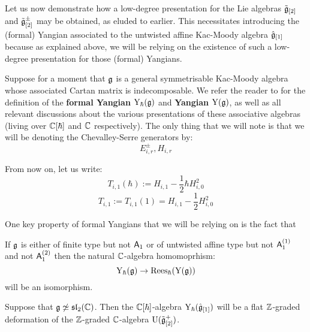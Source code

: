        Let us now demonstrate how a low-degree presentation for the Lie algebras $\tilde{\mathfrak{g}}_{[2]}$ and $\tilde{\mathfrak{g}}_{[2]}^{\pm}$ may be obtained, as eluded to earlier. This necessitates introducing the (formal) Yangian associated to the untwisted affine Kac-Moody algebra $\hat{\mathfrak{g}}_{[1]}$ because as explained above, we will be relying on the existence of such a low-degree presentation for those (formal) Yangians.
        \begin{convention}
            Suppose for a moment that $\mathfrak{g}$ is a general symmetrisable Kac-Moody algebra whose associated Cartan matrix is indecomposable. We refer the reader to \cite[Section 2]{guay_nakajima_wendlandt_affine_yangian_coproduct} for the definition of the \textbf{formal Yangian} $\mathrm{Y}_{\hbar}(\mathfrak{g})$ and \textbf{Yangian} $\mathrm{Y}(\mathfrak{g})$, as well as all relevant discussions about the various  presentations of these associative algebras (living over $\mathbb{C}[\hbar]$ and $\mathbb{C}$ respectively). The only thing that we will note is that we will be denoting the Chevalley-Serre generators by:
                $$E_{i, r}^{\pm}, H_{i, r}$$
        \end{convention}
        \begin{convention}
            From now on, let us write:
                $$T_{i, 1}(\hbar) := H_{i, 1} - \frac12 \hbar H_{i, 0}^2$$
                $$T_{i, 1} := T_{i, 1}(1) = H_{i, 1} - \frac12 H_{i, 0}^2$$
        \end{convention}

        One key property of formal Yangians that we will be relying on is the fact that 
        \begin{lemma} \label{lemma: formal_yangians_as_rees_algebras}
            \cite[Theorem 6.10]{guay_nakajima_wendlandt_affine_yangian_vertex_representations_and_PBW} If $\mathfrak{g}$ is either of finite type but not $\mathsf{A}_1$ or of untwisted affine type but not $\mathsf{A}_1^{(1)}$ and not $\mathsf{A}_1^{(2)}$ then the natural $\mathbb{C}$-algebra homomoprhism:
                $$\mathrm{Y}_{\hbar}(\mathfrak{g}) \to \operatorname{Rees}_{\hbar}( \mathrm{Y}(\mathfrak{g}) )$$
            will be an isomorphism. 
        \end{lemma}
         \begin{corollary} \label{coro: affine_formal_yangians_as_flat_graded_deformations}
            Suppose that $\mathfrak{g} \not \simeq \mathfrak{sl}_2(\mathbb{C})$. Then the $\mathbb{C}[\hbar]$-algebra $\mathrm{Y}_{\hbar}(\hat{\mathfrak{g}}_{[1]})$ will be a flat $\mathbb{Z}$-graded deformation of the $\mathbb{Z}$-graded $\mathbb{C}$-algebra $\mathrm{U}(\tilde{\mathfrak{g}}_{[2]}^+)$. 
         \end{corollary}
         
